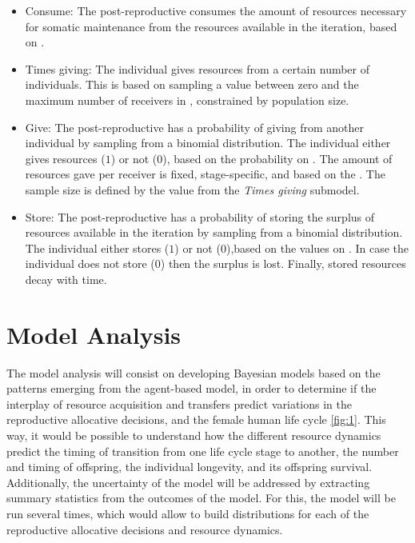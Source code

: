 \documentclass{article}
\begin{document}
\begin{itemize}
\begin{itemize}
        \item Consume: The post-reproductive consumes the amount of resources necessary for somatic maintenance from the resources available in the iteration, based on \cite{kaplan2000theory}.
        \item Times giving: The individual gives resources from a certain number of individuals. This is based on sampling a value between zero and the maximum number of receivers in \cite{gurven2004give}, constrained by population size.
        \item Give: The post-reproductive has a probability of giving from another individual by sampling from a binomial distribution. The individual either gives resources ($1$) or not ($0$), based on the probability on \cite{gurven2004give}. The amount of resources gave per receiver is fixed, stage-specific, and based on the \cite{gurven2004give}. The sample size is defined by the value from the \emph{Times giving} submodel. 
        \item Store: The post-reproductive has a probability of storing the surplus of resources available in the iteration by sampling from a binomial distribution. The individual either stores ($1$) or not ($0$),based on the values on \citep{bowles2011cultivation}. In case the individual does not store ($0$) then the surplus is lost. Finally, stored resources decay with time.
    \end{itemize}
\end{itemize}

\section{Model Analysis}

The model analysis will consist on developing Bayesian models based on the patterns emerging from the agent-based model, in order to determine if the interplay of resource acquisition and transfers predict variations in the reproductive allocative decisions, and the female human life cycle \ref{fig:1}. This way, it would be possible to understand how the different resource dynamics predict the timing of transition from one life cycle stage to another, the number and timing of offspring, the individual longevity, and its offspring survival. Additionally, the uncertainty of the model will be addressed by extracting summary statistics from the outcomes of the model. For this, the model will be run several times, which would allow to build distributions for each of the reproductive allocative decisions and resource dynamics.
\end{document}
